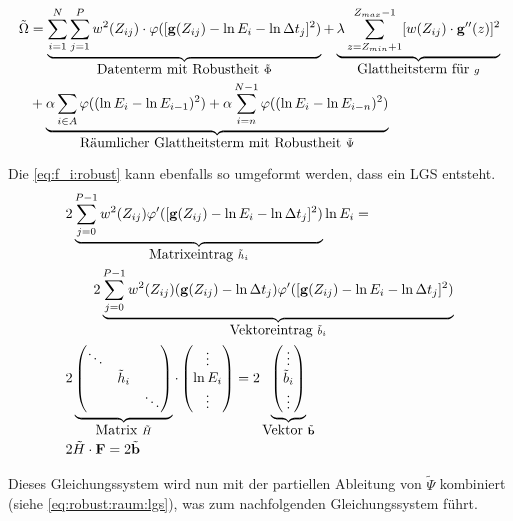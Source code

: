 \begin{align}
\tilde{\Omega} &= 
    \underbrace{\sum_{i=1}^{N} \sum_{j=1}^{P} w^2(Z_{ij})
    \cdot \varphi([\mathbf g(Z_{ij}) - \ln E_i - \ln \Delta t_j]^2)}_{\mbox{Datenterm mit Robustheit }\tilde{\Phi}}
    + \underbrace{\lambda  \sum_{z=Z_{min}+1}^{Z_{max}-1} [w(Z_{ij}) \cdot \mathbf g''(z)]^2}_{\mbox{Glattheitsterm für }g} \nonumber\\
    & + \underbrace{
        \alpha \sum_{i\in A}
            \varphi((\ln E_i - \ln E_{i-1})^2)
        +\alpha \sum_{i=n}^{N-1}\varphi((\ln E_i - \ln E_{i-n})^2)
    }_{\mbox{Räumlicher Glattheitsterm mit Robustheit }\Tilde \Psi}
\\
\end{align}

Die \autoref{eq:f_i:robust} kann ebenfalls so umgeformt werden, dass ein LGS entsteht. 
\begin{align}
    & 2 \underbrace{
        \sum_{j=0}^{P-1} 
            w^2(Z_{ij})
            \varphi'(
                [\mathbf g(Z_{ij})-\ln E_i - \ln \Delta t_j]^2
            )
    }_{\mbox{Matrixeintrag }\tilde h_i}
    \ln E_i = \nonumber \\
    &\qquad 2 \underbrace{
        \sum_{j=0}^{P-1} 
            w^2(Z_{ij})
            (\mathbf g(Z_{ij})-\ln \Delta t_j)
            \varphi'(
                [\mathbf g(Z_{ij})-\ln E_i - \ln \Delta t_j]^2
            )
    }_{\mbox{Vektoreintrag } \tilde b_i}\\
    &
    2 \underbrace{
        \begin{pmatrix}
            \ddots & &\\
            & \tilde h_i & \\
            & & \ddots
        \end{pmatrix}
    }_{\mbox{Matrix }\tilde H}
    \cdot
    \begin{pmatrix}
        \vdots\\ \ln E_i \\ \vdots
    \end{pmatrix}
    =
    2 \underbrace{
        \begin{pmatrix}
            \vdots\\ \tilde b_i \\ \vdots    
        \end{pmatrix}
    }_{\mbox{Vektor }\tilde{\mathbf b}}\\
    & 2 \tilde H \cdot \mathbf F = 2 \tilde{\mathbf{b}}
\end{align}

Dieses Gleichungssystem wird nun mit der partiellen Ableitung von $\tilde \Psi$ kombiniert (siehe \autoref{eq:robust:raum:lgs}), was zum nachfolgenden Gleichungssystem führt.

